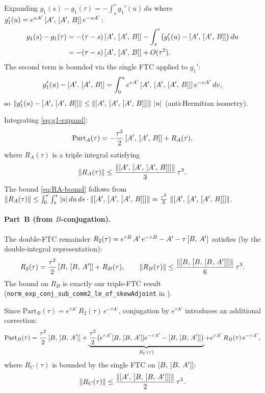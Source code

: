 Expanding $g_1(s) - g_1(\tau) = -\int_s^\tau g_1'(u)\,du$
where $g_1'(u) = e^{uA'}\,[A',\,[A',\,B]]\,e^{-uA'}$:
\begin{align}
  g_1(s) - g_1(\tau)
    &= -(\tau - s)\,[A',\,[A',\,B]] - \int_s^\tau
        \bigl(g_1'(u) - [A',\,[A',\,B]]\bigr)\,du
        \notag \\
    &= -(\tau - s)\,[A',\,[A',\,B]] + O(\tau^2).
        \label{eq:g1-expand}
\end{align}
The second term is bounded via the single FTC applied to $g_1'$:
\[
  g_1'(u) - [A',\,[A',\,B]]
    = \int_0^u e^{vA'}\,[A',\,[A',\,[A',\,B]]]\,e^{-vA'}\,dv,
\]
so $\left\|g_1'(u) - [A',\,[A',\,B]]\right\| \le
  \left\|[A',\,[A',\,[A',\,B]]]\right\|\,|u|$
(anti-Hermitian isometry).

Integrating \eqref{eq:g1-expand}:
\begin{equation}\label{eq:partA-expand}
  \text{Part}_A(\tau) = -\frac{\tau^2}{2}\,[A',\,[A',\,B]]
    + R_A(\tau),
\end{equation}
where $R_A(\tau)$ is a triple integral satisfying
\begin{equation}\label{eq:RA-bound}
  \left\|R_A(\tau)\right\| \le
    \frac{\left\|[A',\,[A',\,[A',\,B]]]\right\|}{3}\,\tau^3.
\end{equation}
The bound \eqref{eq:RA-bound} follows from
$\left\|R_A(\tau)\right\| \le \int_0^\tau \int_s^\tau |u|\,du\,ds
  \cdot \left\|[A',\,[A',\,[A',\,B]]]\right\|
  = \frac{\tau^3}{3}\,\left\|[A',\,[A',\,[A',\,B]]]\right\|$.

\paragraph{Part~B (from $B$-conjugation).}
The double-FTC remainder
$R_2(\tau) = e^{\tau B}\,A'\,e^{-\tau B} - A' - \tau\,[B,\,A']$
satisfies (by the double-integral representation):
\begin{equation}\label{eq:R2-expand}
  R_2(\tau) = \frac{\tau^2}{2}\,[B,\,[B,\,A']] + R_B(\tau),
  \qquad
  \left\|R_B(\tau)\right\| \le
    \frac{\left\|[B,\,[B,\,[B,\,A']]]\right\|}{6}\,\tau^3.
\end{equation}
The bound on $R_B$ is exactly our triple-FTC result
(\texttt{norm\_exp\_conj\_sub\_comm2\_le\_of\_skewAdjoint}
in ).

Since $\text{Part}_B(\tau) = e^{\tau A'}\,R_2(\tau)\,e^{-\tau A'}$,
conjugation by $e^{\tau A'}$ introduces an additional correction:
\begin{equation}\label{eq:partB-expand}
  \text{Part}_B(\tau) = \frac{\tau^2}{2}\,[B,\,[B,\,A']]
    + \underbrace{\frac{\tau^2}{2}\bigl(
      e^{\tau A'}[B,\,[B,\,A']]e^{-\tau A'}
      - [B,\,[B,\,A']]\bigr)}_{R_C(\tau)}
    + e^{\tau A'}\,R_B(\tau)\,e^{-\tau A'},
\end{equation}
where $R_C(\tau)$ is bounded by the single FTC on $[B,\,[B,\,A']]$:
\begin{equation}\label{eq:RC-bound}
  \left\|R_C(\tau)\right\| \le
    \frac{\left\|[A',\,[B,\,[B,\,A']]]\right\|}{2}\,\tau^3.
\end{equation}

